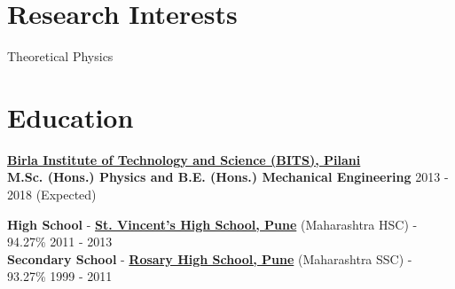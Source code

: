 \documentclass[margin, centered]{res}
\begin{document}
\begin{resume}

\section{Research Interests}
Theoretical Physics\\


\section{Education}
\textbf{\href{http://www.bits-pilani.ac.in/}{Birla Institute of Technology and Science (BITS), Pilani}}\\
\textbf{M.Sc. (Hons.) Physics and B.E. (Hons.) Mechanical Engineering} \hfill 2013 - 2018 (Expected)

\textbf{High School} - \textbf{\href{http://www.stvincentspune.com/}{St. Vincent's High School, Pune}} (Maharashtra HSC) - 94.27\% \hfill 2011 - 2013 \\
\textbf{Secondary School} - \textbf{\href{http://www.rosaryedu.org}{Rosary High School, Pune}} (Maharashtra SSC) - 93.27\% \hfill 1999 - 2011


\end{resume}
\end{document}
